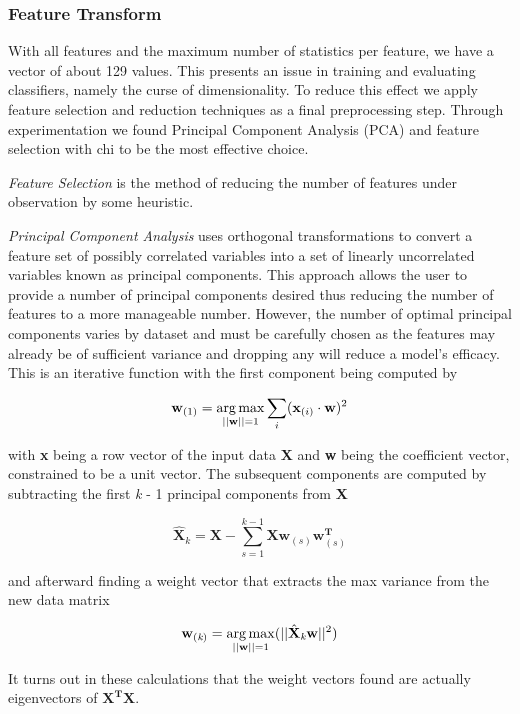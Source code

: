 \subsubsection{Feature Transform}
With all features and the maximum number of statistics per feature, we have a vector of about 129 values. This presents an issue in training and evaluating classifiers, namely the curse of dimensionality. To reduce this effect we apply feature selection and reduction techniques as a final preprocessing step. Through experimentation we found Principal Component Analysis (PCA) and feature selection with chi to be the most effective choice.

\textit{Feature Selection} is the method of reducing the number of features under observation by some heuristic.

\textit{Principal Component Analysis} uses orthogonal transformations to convert a feature set of possibly correlated variables into a set of linearly uncorrelated variables known as principal components. This approach allows the user to provide a number of principal components desired thus reducing the number of features to a more manageable number. However, the number of optimal principal components varies by dataset and must be carefully chosen as the features may already be of sufficient variance and dropping any will reduce a model's efficacy. This is an iterative function with the first component being computed by

\begin{equation}
    \textbf{w}_{(1)} = \operatorname*{arg\,max}_{||\textbf{w}||=1}{\sum_{i}(\textbf{x}_{(i)} \cdot \textbf{w})^2}
\end{equation}

with \textbf{x} being a row vector of the input data \textbf{X} and \textbf{w} being the coefficient vector, constrained to be a unit vector. The subsequent components are computed by subtracting the first \textit{k} - 1 principal components from \textbf{X}

\begin{equation}
    \hat{\textbf{X}}_k = \textbf{X} - \sum_{s=1}^{k-1}{\textbf{X}\textbf{w}_{(s)}\textbf{w}_{(s)}^\textbf{T}}
\end{equation}

and afterward finding a weight vector that extracts the max variance from the new data matrix

\begin{equation}
    \textbf{w}_{(\textit{k})} = \operatorname*{arg\,max}_{||\textbf{w}||=1}(||\hat{\textbf{X}}_{\textit{k}}\textbf{w}||^2)
\end{equation}

It turns out in these calculations that the weight vectors found are actually eigenvectors of $ \textbf{X}^\textbf{T}\textbf{X} $.